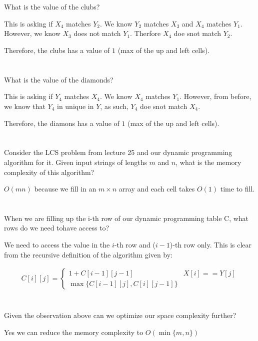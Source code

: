 \documentclass [12pt]{article}
\begin{document}
\section{} What is the value of the clubs?

\begin{Solution}
This is asking if $X_4$ matches $Y_2$. We know $Y_2$ matches $X_3$ and $X_4$ matches $Y_1$. However, we know $X_3$ does not match $Y_1$. Therfore $X_4$ doe snot match $Y_2$.

Therefore, the clubs has a value of $1$ (max of the up and left cells).
\end{Solution}


\section{} What is the value of the diamonds?

\begin{Solution}
This is asking if $Y_4$ matches $X_4$. We know $X_4$ matches $Y_1$. However, from before, we know that $Y_4$ in unique in $Y$, as such, $Y_4$ doe snot match $X_4$.

Therefore, the diamons has a value of $1$ (max of the up and left cells).
\end{Solution}


\section{} Consider the LCS problem from lecture 25 and our dynamic programming algorithm for it. Given input strings of lengths $m$ and $n$, what is the memory complexity of this algorithm?

\begin{Solution}
$O(mn)$ because we fill in an $m \times n$ array and each cell takes $O(1)$ time to fill.
\end{Solution}


\section{} When we are filling up the i-th row of our dynamic programming table C, what rows do we need tohave access to?

\begin{Solution}
We need to access the value in the $i$-th row and ($i-1$)-th row only. This is clear from the recursive definition of the algorithm given by:

\begin{align*}
C[i][j] = \begin{cases}
    1 + C[i-1][j-1] & X[i] == Y[j] \\
    \max\{C[i-1][j], C[i][j-1] \}& 
\end{cases}
\end{align*}
\end{Solution}

\section{} Given the observation above can we optimize our space complexity further?

\begin{Solution}
Yes we can reduce the memory complexity to $O(\min \{ m,n \})$
\end{Solution}
\end{document}
